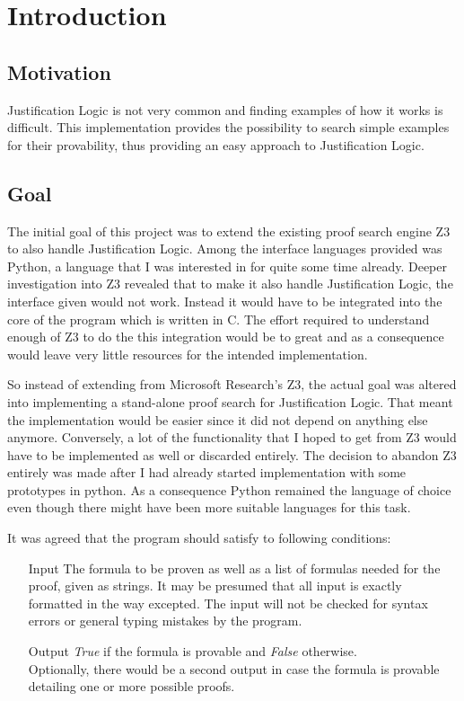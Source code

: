 \chapter{Introduction}

\section{Motivation}
Justification Logic is not very common and finding examples of how it works is difficult. This implementation provides the possibility to search simple examples for their provability, thus providing an easy approach to Justification Logic.

\section{Goal}
The initial goal of this project was to extend the existing proof search engine Z3~\cite{z3} to also handle Justification Logic. Among the interface languages provided was Python, a language that I was interested in for quite some time already. Deeper investigation into Z3 revealed that to make it also handle Justification Logic, the interface given would not work. Instead it would have to be integrated into the core of the program which is written in C. The effort required to understand enough of Z3 to do the this integration would be to great and as a consequence would leave very little resources for the intended implementation.

So instead of extending from Microsoft Research's Z3, the actual goal was altered into implementing a stand-alone proof search for Justification Logic. That meant the implementation would be easier since it did not depend on anything else anymore. Conversely, a lot of the functionality that I hoped to get from Z3 would have to be implemented as well or discarded entirely. The decision to abandon Z3 entirely was made after I had already started implementation with some prototypes in python. As a consequence Python remained the language of choice even though there might have been more suitable languages for this task.

It was agreed that the program should satisfy to following conditions:

\begin{itemize}
	\item[Input] The formula to be proven as well as a list of formulas needed for the proof, given as strings. It may be presumed that all input is exactly formatted in the way excepted. The input will not be checked for syntax errors or general typing mistakes by the program.
	\item[Output] \emph{True} if the formula is provable and \emph{False} otherwise. \\Optionally, there would be a second output in case the formula is provable detailing one or more possible proofs.
\end{itemize}

